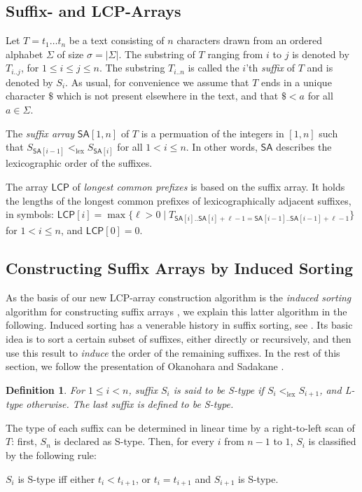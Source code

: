 \documentclass[11pt,onecolumn,final]{article} \usepackage[latin1]{inputenc}
\newcommand{\LCP}[0]{\mathsf{LCP}}
\newcommand{\SA}[0]{\mathsf{SA}}
\newcommand{\SF}[1]{S_{#1}}
\theoremstyle{plain}
\newtheorem{definition}{Definition}
\theoremstyle{remark}
\begin{document}
\subsection{Suffix- and LCP-Arrays}
\label{sec:succ-data-struct}
Let $T=t_1\dots t_n$ be a text consisting of $n$ characters drawn from an ordered alphabet $\Sigma$ of size $\sigma = |\Sigma|$. The substring of $T$ ranging from $i$ to $j$ is denoted by $T_{i..j}$, for $1\le i \le j \le n$. The substring $T_{i..n}$ is called the $i$'th \emph{suffix} of $T$ and is denoted by $S_i$. As usual, for convenience we assume that $T$ ends in a unique character $\$$ which is not present elsewhere in the text, and that $\$<a$ for all $a\in\Sigma$.

The \emph{suffix array} $\SA[1,n]$ of $T$ is a permuation of the integers in $[1,n]$ such that $\SF{\SA[i-1]} <_\mathrm{lex} \SF{\SA[i]}$ for all $1 < i \le n$. In other words, $\SA$ describes the lexicographic order of the suffixes. 

The array $\LCP$ of \emph{longest common prefixes} is based on the suffix array. It holds the lengths of the longest common prefixes of lexicographically adjacent suffixes, in symbols: $\LCP[i] = \max\{\ell>0\mid T_{\SA[i]..\SA[i]+\ell-1 = \SA[i-1]..\SA[i-1]+\ell-1}\}$ for $1 < i \le n$, and $\LCP[0]=0$. 

\subsection{Constructing Suffix Arrays by Induced Sorting}
\label{sect:inducing_sa}
As the basis of our new LCP-array construction algorithm is the \emph{induced sorting} algorithm for constructing suffix arrays \cite{nong09linear}, we explain this latter algorithm in the following. Induced sorting has a venerable history in suffix sorting, see \cite{itoh99efficient, seward00performance, ko05space}. Its basic idea is to sort a certain subset of suffixes, either directly or recursively, and then use this result to \emph{induce} the order of the remaining suffixes. In the rest of this section, we follow the presentation of Okanohara and Sadakane \cite{okanohara09linear}.

\begin{definition}
  For $1 \le i < n$, suffix $\SF{i}$ is said to be \emph{S-type} if $\SF{i} <_\mathrm{lex} \SF{i+1}$, and \emph{L-type} otherwise. The last suffix is defined to be S-type.
\end{definition}

The type of each suffix can be determined in linear time by a right-to-left scan of $T$: first, $\SF{n}$ is declared as S-type. Then, for every $i$ from $n-1$ to $1$, $\SF{i}$ is classified by the following rule:
\vspace{-5ex}
\begin{center}
\item $\SF{i}$ is S-type iff either $t_i < t_{i+1}$, or $t_i = t_{i+1}$ and $\SF{i+1}$ is S-type.
\end{center}
\end{document}
